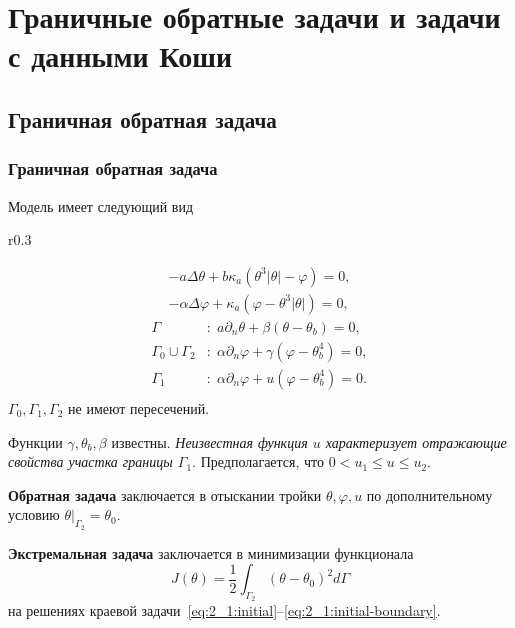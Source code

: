 \section{Граничные обратные задачи и задачи с данными Коши}\label{sec:rev}

\subsection{Граничная обратная задача}\label{subsec:rev}
\begin{frame}
    \frametitle{Граничная обратная задача}
    Модель имеет следующий вид
    \begin{wrapfigure}{r}{0.3\textwidth}
    \end{wrapfigure}
    \begin{gather}
        \label{eq:2_1:initial}
        - a \Delta \theta + b \kappa_a(\theta ^ 3 | \theta | - \varphi) = 0, \\
        - \alpha \Delta \varphi + \kappa_a (\varphi - \theta ^3 | \theta |) = 0,
    \end{gather}
    \begin{equation}
        \label{eq:2_1:initial-boundary}
        \begin{aligned}
            \Gamma &: \; a \partial_n \theta + \beta (\theta - \theta _b) = 0, \\
            \Gamma_0 \cup \Gamma_2 &: \; \alpha \partial_n \varphi
            + \gamma(\varphi - \theta_b ^4 ) = 0, \\
            \Gamma_1 &: \; \alpha \partial_n \varphi + u(\varphi - \theta_b ^4 ) = 0. \\
        \end{aligned}
    \end{equation}
    $\Gamma_0, \Gamma_1, \Gamma_2$ не имеют пересечений.

    Функции $\gamma, \theta_b, \beta$ известны.
    \textit{Неизвестная функция $u$ характеризует отражающие свойства участка границы $\Gamma_1$}.
    Предполагается, что $0 < u_1 \leq u \leq u_2$.

    \textbf{Обратная задача} заключается в отыскании тройки $\theta, \varphi, u$
    по дополнительному условию $\theta|_{\Gamma_2} = \theta_0$.

    \textbf{Экстремальная задача} заключается в минимизации функционала
    \begin{equation}
        \label{eq:2_1:quality}
        J(\theta) = \frac{1}{2} \int_{\Gamma_2} (\theta - \theta_0)^2 d\Gamma
    \end{equation}
    на решениях краевой задачи~\eqref{eq:2_1:initial}--\eqref{eq:2_1:initial-boundary}.
\end{frame}
